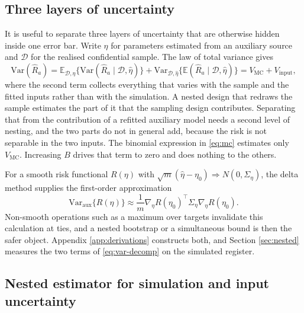 \documentclass[11pt,a4paper]{article}
\theoremstyle{plain}
\theoremstyle{definition}
\theoremstyle{definition}
\theoremstyle{plain}
\newcommand{\E}{\mathbb{E}}
\begin{document}
\subsection{Three layers of uncertainty}

It is useful to separate three layers of uncertainty that are otherwise hidden
inside one error bar. Write $\widehat\eta$ for parameters estimated from an
auxiliary source and $\mathcal{D}$ for the realised confidential sample. The law
of total variance gives
\begin{equation}
\mathrm{Var}(\widehat R_a)
=\E_{\mathcal{D},\widehat\eta}
  \{\mathrm{Var}(\widehat R_a\mid\mathcal{D},\widehat\eta)\}
 +\mathrm{Var}_{\mathcal{D},\widehat\eta}
  \{\E(\widehat R_a\mid\mathcal{D},\widehat\eta)\}
= V_{\mathrm{MC}} + V_{\mathrm{input}} ,
\label{eq:var-decomp}
\end{equation}
where the second term collects everything that varies with the sample and the
fitted inputs rather than with the simulation. A nested design that redraws the sample estimates the part of it that the sampling
design contributes. Separating that from the contribution of a refitted auxiliary
model needs a second level of nesting, and the two parts do not in general add,
because the risk is not separable in the two inputs.
The binomial expression in \eqref{eq:mc} estimates only $V_{\mathrm{MC}}$.
Increasing $B$ drives that term to zero and does nothing to the others.

For a smooth risk functional $R(\eta)$ with $\sqrt m(\widehat\eta-\eta_0)
\Rightarrow N(0,\Sigma_\eta)$, the delta method supplies the first-order
approximation \citep{vandervaart1998}
\begin{equation}
\mathrm{Var}_{\mathrm{aux}}\{R(\widehat\eta)\}
\approx \frac{1}{m}\nabla_\eta R(\eta_0)^\top
\Sigma_\eta\nabla_\eta R(\eta_0) .
\label{eq:delta-risk}
\end{equation}
Non-smooth operations such as a maximum over targets invalidate this calculation
at ties, and a nested bootstrap or a simultaneous bound is then the safer object.
Appendix \ref{app:derivations} constructs both, and Section \ref{sec:nested}
measures the two terms of \eqref{eq:var-decomp} on the simulated register.

\subsection{Nested estimator for simulation and input uncertainty}
\end{document}
